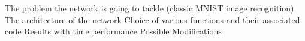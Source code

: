 \startsection[title=Python Implementation]
\startitemize
\startitem 
The problem the network is going to tackle (classic MNIST image recognition)
\stopitem
\startitem
The architecture of the network
\stopitem
\startitem
Choice of various functions and their associated code
\stopitem
\startitem
Results with time performance
\stopitem
\startitem
Possible Modifications
\stopitem
\stopitemize
\stopsection